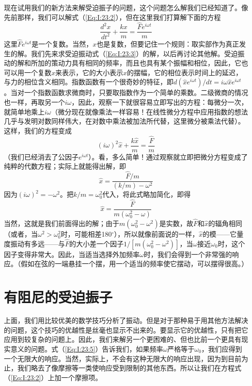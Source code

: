 现在试用我们的新方法来解受迫振子的问题，这个问题怎么解我们已经知道了。像先前那样，我们可以解式（\ref{Eq:I:23:2}），但在这里我们打算解下面的方程
\begin{equation}
    \label{Eq:I:23:3}
    \frac{d^2x}{dt^2} + \frac{kx}{m} = \frac{\hat{F}e^{i\omega t}}{m}
\end{equation}
这里$\hat{F}e^{i\omega t}$是一个复数。当然，$x$也是复数，但要记住一个规则：取实部作为真正发生的解。我们先来求受迫振动式（\ref{Eq:I:23:3}）的解，以后再讨论其他解。受迫振动的解和所加的策动力具有相同的频率，而且也具有某个振幅和相位，因此，它也可以用一个复数$\hat{x}$来表示，它的大小表示$x$的摆幅，它的相位表示时间上的延迟，与力的相位含义相同。指数函数有一个很奇妙的特征，即$d(\hat{x}e^{i\omega t})/dt=i\omega\hat{x}e^{i\omega t}$。当对一个指数函数求微商时，只要取指数作为一个简单的乘数。二级微商的情况也一样，再取另一个$i\omega$，因此，观察一下就很容易立即写出的方程：每微分一次，就简单地乘上$i\omega$（微分现在就像乘法一样容易！在线性微分方程中应用指数的想法几乎与发明对数同样伟大，在对数中乘法被加法所代替，这里微分被乘法代替）。这样，我们的方程变成
\begin{equation}
    \label{Eq:I:23:4}
    (i\omega)^2\hat{x} + \frac{k\hat{x}}{m} = \frac{\hat{F}}{m}
\end{equation}
（我们已经消去了公因子$e^{i\omega t}$）。看，多么简单！通过观察就立即把微分方程变成了纯粹的代数方程；实际上就能得出解，即
\begin{equation*}
    \hat{x} = \frac{\hat{F}/m}{(k/m)-\omega^2}
\end{equation*}
因为$(i\omega)^2=-\omega^2$。把$k/m=\omega_0^2$代入，将此式略加简化，即得
\begin{equation}
    \label{Eq:I:23:5}
    \hat{x} = \frac{\hat{F}}{m(\omega_0^2 - \omega)}
\end{equation}
当然，这就是我们前面得出的解；由于$m(\omega_0^2 -\omega^2)$是实数，故$\hat{F}$和$\hat{x}$的辐角相同（或者，当$\omega^2>\omega_0^2$时，可能相差180$^\circ$），所以就像前面说的一样，$\hat{x}$的模——它量度振动有多远——与$\hat{F}$的大小差一个因子$1/[m(\omega_0^2 - \omega^2)]$，当$\omega$接近$\omega_0$时，这个因子变得非常大。因此，当适当选择外加频率$\omega$时，我们会得到一个非常强的响应。（假如在弦的一端悬挂一个摆，用一个适当的频率使它摆动，可以摆得很高。）

\section{有阻尼的受迫振子}

上面，我们用比较优美的数学技巧分析了振动。但是对于那种易于用其他方法解决的问题，这个技巧的优越性是丝毫也显示不出来的。要显示它的优越性，只有把它应用到较复杂的问题上。因此，我们来解另一个更困难的、但也比前一个更具有现实意义的问题。式（\ref{Eq:I:23:5}）告诉我们，如果频率$\omega$严格等于$\omega_0$，我们应得到一个无限大的响应。当然，实际上，不会有这种无限大的响应出现，因为到目前为止，我们略去了像摩擦等一类使响应受到限制的其他东西。所以让我们在方程式（\ref{Eq:I:23:2}）上加一个摩擦项。

